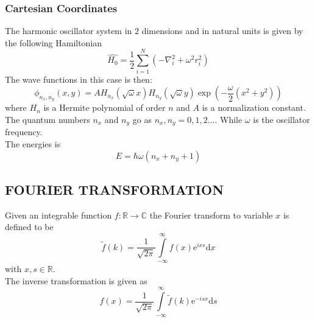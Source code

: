 \documentclass[a4paper, hidelinks, 10pt]{article}\usepackage[utf8]{inputenc}
\let\oldsubsection\subsection
\renewcommand{\subsection}[1]{\centering \oldsubsection{{#1}} \justifying}
\newcommand{\md}{\mathrm{d}} %
\newcommand{\me}{\mathrm{e}} %
\newcommand{\rarr}{\rightarrow} %
\newcommand{\infint}{\int\limits^{\infty}_{-\infty}}
\begin{document}
\subsubsection{Cartesian Coordinates}
\label{ssub:Cartesian Coordinates}
    The harmonic oscillator system in $2$ dimensions and in natural units is
    given by the following Hamiltonian
        \begin{equation}
            \hat{H_0} = \frac{1}{2}\sum^N_{i=1}\left(-\nabla^2_i + \omega^2
            r^2_i\right)
            \label{eq:cartHarmOsc}
        \end{equation}
    The wave functions in this case is then:
        \begin{equation}
            \phi_{n_x,n_y}(x,y) =
            AH_{n_x}(\sqrt{\omega}x)H_{n_y}(\sqrt{\omega}y)
            \exp(-\frac{\omega}{2}(x^2+y^2))
            \label{eq:cartUarmOscWavef}
        \end{equation}
    where $H_n$ is a Hermite polynomial of order $n$ and $A$ is a normalization
    constant. The quantum numbers $n_x$ and $n_y$ go as $n_x,n_y=0,1,2\dots$.
    While $\omega$ is the oscillator frequency. \\
    The energies is 
        \begin{equation}
            E = \hbar\omega\left(n_x + n_y + 1\right)
            \label{eq:cartHarmOscE}
        \end{equation}

\subsection{FOURIER TRANSFORMATION}
\label{sub:fourier_transformation}
    Given an integrable function $f:\mathbb{R}\rarr\mathbb{C}$ the Fourier
    transform to variable $x$ is defined to be
        \begin{equation}
            \tilde{f}(k) = \frac{1}{\sqrt{2\pi}}\infint f(x)\me^{ixs} \md x
            \label{eq:FourierTransform}
        \end{equation}
    with $x,s\in\mathbb{R}$. \\
    The inverse transformation is given as
        \begin{equation}
            f(x) = \frac{1}{\sqrt{2\pi}}\infint \tilde{f}(k)\me^{-isx} \md s
            \label{eq:invFourier}
        \end{equation}
\end{document}
